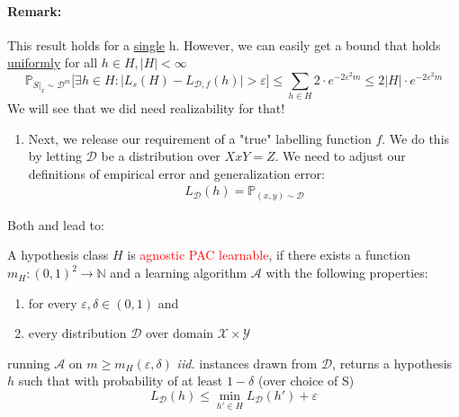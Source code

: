 \documentclass[10pt,a4paper]{article}
\theoremstyle{definition}
\theoremstyle{plain}
\begin{document}
\paragraph{Remark:} This result holds for a \underline{single} h. However, we can easily get a bound that holds \underline{uniformly} for all $h \in H, |H| < \infty$
$$ \mathbb{P}_{S|_x \sim \mathcal{D}^m} \bigg[\exists h \in H: \big|L_{s}(H) - L_{\mathcal{D}, f}(h) \big| > \varepsilon \bigg] \leq \sum_{h \in H} 2\cdot e^{-2 \varepsilon^2 m} \leq 2 \big|H\big| \cdot e^{-2 \varepsilon^2 m} $$ 
We will see that we did need realizability for that!

\begin{enumerate}
	\item[\protect\fbox{2}] Next, we release our requirement of a "true" labelling function $f$. We do this by letting $\mathcal{D}$ be a distribution over $X x Y = Z$. We need to adjust our definitions of empirical error and generalization error:
	\begin{eqnarray}
		L_{\mathcal{D}}(h) = \mathbb{P}_{(x, y) \sim \mathcal{D}}
	\end{eqnarray}
\end{enumerate}
Both \protect{} and \protect{} lead to:
\begin{boxeddef}
	A hypothesis class $H$ is \textcolor{red}{agnostic PAC learnable}, if there exists a function $m_H: (0,1)^2 \to \mathbb{N}$ and a learning algorithm $\mathcal{A}$ with the following properties:
	\begin{enumerate}
		\item for every $\varepsilon, \delta \in (0,1)$ and
		\item every distribution $\mathcal{D}$ over domain $\mathcal{X} \times \mathcal{Y}$
	\end{enumerate}
	running $\mathcal{A}$ on $m \geq m_H(\varepsilon, \delta)$ \textit{iid.} instances drawn from $\mathcal{D}$, returns a hypothesis $h$ such that with probability of at least $1-\delta$ (over choice of S) 
	$$ L_{\mathcal{D}}(h) \leq \min_{h' \in H} L_{\mathcal{D}}(h') + \varepsilon$$
\end{boxeddef}
\end{document}
